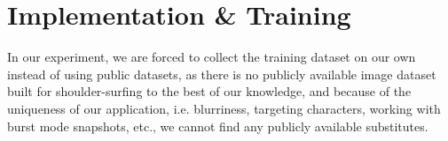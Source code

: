 \section{Implementation \& Training}
\label{sec-implementation-and-training}




In our experiment, we are forced to collect the training dataset on our own instead of using public datasets, as there is no publicly available image dataset built for shoulder-surfing to the best of our knowledge, and because of the uniqueness of our application, i.e. blurriness, targeting characters, working with burst mode snapshots, etc., we cannot find any publicly available substitutes.


